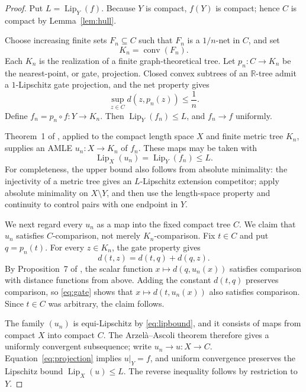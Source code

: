 \documentclass[11pt]{article}
\newcommand{\R}{\mathbb R}
\newcommand{\Lip}{\operatorname{Lip}}
\newcommand{\conv}{\operatorname{conv}}
\begin{document}
\begin{proof}
Put $L=\Lip_Y(f)$.  Because $Y$ is compact, $f(Y)$ is compact; hence
$C$ is compact by Lemma~\ref{lem:hull}.

Choose increasing finite sets $F_n\subseteq C$ such that $F_n$ is a
$1/n$-net in $C$, and set
\[
 K_n=\conv(F_n).
\]
Each $K_n$ is the realization of a finite graph-theoretical tree.  Let
$p_n:C\to K_n$ be the nearest-point, or gate, projection.  Closed convex
subtrees of an $\R$-tree admit a $1$-Lipschitz gate projection, and the net
property gives
\begin{equation}\label{eq:projection}
 \sup_{z\in C} d(z,p_n(z))\leq \frac1n.
\end{equation}
Define $f_n=p_n\circ f:Y\to K_n$.  Then
$\Lip_Y(f_n)\leq L$, and $f_n\to f$ uniformly.

Theorem~1 of \cite{NS}, applied to the compact length space $X$ and finite
metric tree $K_n$, supplies an AMLE $u_n:X\to K_n$ of $f_n$.  These maps
may be taken with
\begin{equation}\label{eq:lipbound}
 \Lip_X(u_n)=\Lip_Y(f_n)\leq L.
\end{equation}
For completeness, the upper bound also follows from absolute minimality:
the injectivity of a metric tree gives an $L$-Lipschitz extension competitor;
apply absolute minimality on $X\setminus Y$, and then use the length-space
property and continuity to control pairs with one endpoint in $Y$.

We next regard every $u_n$ as a map into the fixed compact tree $C$.  We
claim that $u_n$ satisfies $C$-comparison, not merely $K_n$-comparison.
Fix $t\in C$ and put $q=p_n(t)$.  For every $z\in K_n$, the gate property
gives
\begin{equation}\label{eq:gate}
 d(t,z)=d(t,q)+d(q,z).
\end{equation}
By Proposition~7 of \cite{NS}, the scalar function
$x\mapsto d(q,u_n(x))$ satisfies comparison with distance functions from
above.  Adding the constant $d(t,q)$ preserves comparison, so
\eqref{eq:gate} shows that $x\mapsto d(t,u_n(x))$ also satisfies comparison.
Since $t\in C$ was arbitrary, the claim follows.

The family $(u_n)$ is equi-Lipschitz by \eqref{eq:lipbound}, and it consists
of maps from compact $X$ into compact $C$.  The Arzel\`a--Ascoli theorem
\cite[Theorem~6.1]{Munkres}
therefore gives a uniformly convergent subsequence; write
$u_n\to u:X\to C$.  Equation~\eqref{eq:projection} implies
$u|_Y=f$, and uniform convergence preserves the Lipschitz bound
$\Lip_X(u)\leq L$.  The reverse inequality follows by restriction to $Y$.


\end{proof}
\end{document}
